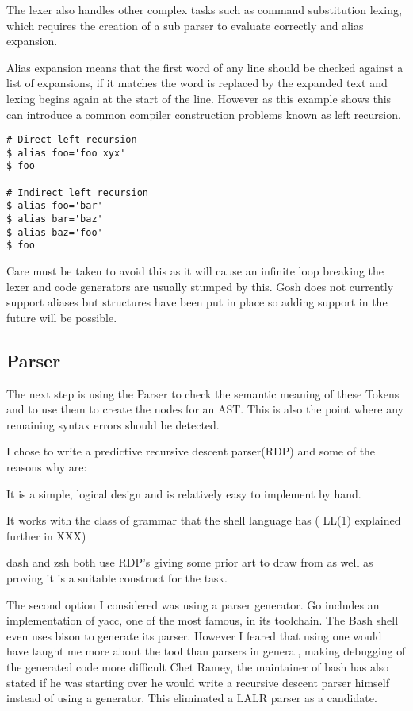 The lexer also handles other complex tasks such as command substitution lexing, which requires the creation of a sub parser to evaluate correctly and alias expansion.

Alias expansion means that the first word of any line should be checked against a list of expansions, if it matches the word is replaced by the expanded text and lexing begins again at the start of the line.
However as this example shows this can introduce a common compiler construction problems known as left recursion.
\begin{verbatim}
# Direct left recursion
$ alias foo='foo xyx'
$ foo

# Indirect left recursion
$ alias foo='bar'
$ alias bar='baz'
$ alias baz='foo'
$ foo
\end{verbatim}
Care must be taken to avoid this as it will cause an infinite loop breaking the lexer and code generators are usually stumped by this.
Gosh does not currently support aliases but structures have been put in place so adding support in the future will be possible.

\subsection{Parser}
The next step is using the Parser to check the semantic meaning of these Tokens and to use them to create the nodes for an AST.
This is also the point where any remaining syntax errors should be detected.

I chose to write a predictive recursive descent parser(RDP) and some of the reasons why are:
\begin{enumerate*}
	\item It is a simple, logical design and is relatively easy to implement by hand.
    \item It works with the class of grammar that the shell language has (
    LL(1) explained further in XXX)
    \item dash and zsh both use RDP's giving some prior art to draw from as well as proving it is a suitable construct for the task.
\end{enumerate*}

The second option I considered was using a parser generator.
Go includes an implementation of yacc, one of the most famous, in its toolchain.
The Bash shell even uses bison to generate its parser.
However I feared that using one would have taught me more about the tool than parsers in general, making debugging of the generated code more difficult 
Chet Ramey, the maintainer of bash has also stated if he was starting over he would write a recursive descent parser himself\cite{BASH-ARCH} instead of using a generator.
This eliminated a LALR parser as a candidate.

